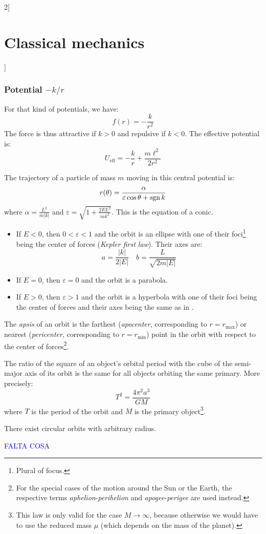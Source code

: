 \documentclass[../../../main_physics.tex]{subfiles}
\begin{document}
\begin{multicols}{2}[\section{Classical mechanics}]
  \subsubsection{Potential \texorpdfstring{$-k/r$}{-k/r}}
  \begin{proposition}
    For that kind of potentials, we have: $$f(r)=-\frac{k}{r^2}$$
    The force is thus attractive if $k>0$ and repulsive if $k<0$. The effective potential is: $$U_\text{eff}=-\frac{k}{r}+\frac{m\ell^2}{2r^2}$$
  \end{proposition}
  \begin{theorem}
    The trajectory of a particle of mass $m$ moving in this central potential is: $$r(\theta)=\frac{\alpha}{\varepsilon\cos\theta+\operatorname{sgn} k}$$ where $\displaystyle\alpha=\frac{L^2}{m|k|}$ and $\displaystyle\varepsilon=\sqrt{1+\frac{2EL^2}{mk^2}}$. This is the equation of a conic.
    \begin{itemize}
      \item If $E<0$, then $0<\varepsilon<1$ and the orbit is an ellipse with one of their foci\footnote{Plural of focus.} being the center of forces (\emph{Kepler first law}). Their axes are:
            \begin{equation}\label{CM_axesKepler}
              a=\frac{|k|}{2|E|}\quad b=\frac{L}{\sqrt{2m|E|}}
            \end{equation}
      \item If $E=0$, then $\varepsilon=0$ and the orbit is a parabola.
      \item If $E>0$, then $\varepsilon>1$ and the orbit is a hyperbola with one of their foci being the center of forces and their axes being the same as in .
    \end{itemize}
  \end{theorem}
  \begin{definition}
    The \emph{apsis} of an orbit is the farthest (\emph{apocenter}, corresponding to $r=r_\text{max}$) or nearest (\emph{pericenter}, corresponding to $r=r_\text{min}$) point in the orbit with respect to the center of forces\footnote{For the special cases of the motion around the Sun or the Earth, the respective terms \emph{aphelion}-\emph{perihelion} and \emph{apogee}-\emph{perigee} are used instead.}.
  \end{definition}
  \begin{law}
    The ratio of the square of an object's orbital period with the cube of the semi-major axis of its orbit is the same for all objects orbiting the same primary. More precisely: $$T^2=\frac{4\pi^2a^3}{GM}$$ where $T$ is the period of the orbit and $M$ is the primary object\footnote{This law is only valid for the case $M\to\infty$, because otherwise we would have to use the reduced mass $\mu$ (which depends on the mass of the planet).}.
  \end{law}
  \begin{theorem}
    There exist circular orbits with arbitrary radius.
  \end{theorem}
  \textcolor{blue}{FALTA COSA}

\end{multicols}
\end{document}
